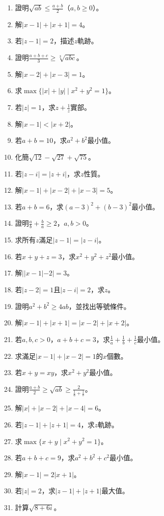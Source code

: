 \begin{enumerate}[label=\arabic*.]
    \item 證明$\sqrt{ab} \leq \frac{a + b}{2}$（$a, b \geq 0$）。
    \item 解$|x - 1| + |x + 1| = 4$。
    \item 若$|z - 1| = 2$，描述$z$軌跡。
    \item 證明$\frac{a + b + c}{3} \geq \sqrt[3]{abc}$。
    \item 解$|x - 2| + |x - 3| = 1$。
    \item 求$\max\{|x| + |y| \mid x^2 + y^2 = 1\}$。
    \item 若$|z| = 1$，求$z + \frac{1}{z}$實部。
    \item 解$|x - 1| < |x + 2|$。
    \item 若$a + b = 10$，求$a^2 + b^2$最小值。
    \item 化簡$\sqrt{12} - \sqrt{27} + \sqrt{75}$。
    \item 若$|z - i| = |z + i|$，求$z$性質。
    \item 解$|x - 1| + |x - 2| + |x - 3| = 5$。
    \item 若$a + b = 6$，求$(a - 3)^2 + (b - 3)^2$最小值。
    \item 證明$\frac{a}{b} + \frac{b}{a} \geq 2$，$a, b > 0$。
    \item 求所有$z$滿足$|z - 1| = |z - i|$。
    \item 若$x + y + z = 3$，求$x^2 + y^2 + z^2$最小值。
    \item 解$||x - 1| - 2| = 3$。
    \item 若$|z - 2| = 1$且$|z - i| = 2$，求$z$。
    \item 證明$a^2 + b^2 \geq 4ab$，並找出等號條件。
    \item 解$|x - 1| + |x + 1| = |x - 2| + |x + 2|$。
    \item 若$a, b, c > 0$，$a + b + c = 3$，求$\frac{1}{a} + \frac{1}{b} + \frac{1}{c}$最小值。
    \item 求滿足$|x - 1| + |x - 2| = 1$的$x$個數。
    \item 若$x + y = xy$，求$x^2 + y^2$最小值。
    \item 證明$\frac{a + b}{2} \geq \sqrt{ab} \geq \frac{2}{\frac{1}{a} + \frac{1}{b}}$。
    \item 解$|x| + |x - 2| + |x - 4| = 6$。
    \item 若$|z - 1| + |z + 1| = 4$，求$z$軌跡。
    \item 求$\max\{x + y \mid x^2 + y^2 = 1\}$。
    \item 若$a + b + c = 9$，求$a^2 + b^2 + c^2$最小值。
    \item 解$|x - 1| = 2|x + 1|$。
    \item 若$|z| = 2$，求$|z - 1| + |z + 1|$最大值。
    \item 計算$\sqrt{8 + 6i}$。
\end{enumerate}

